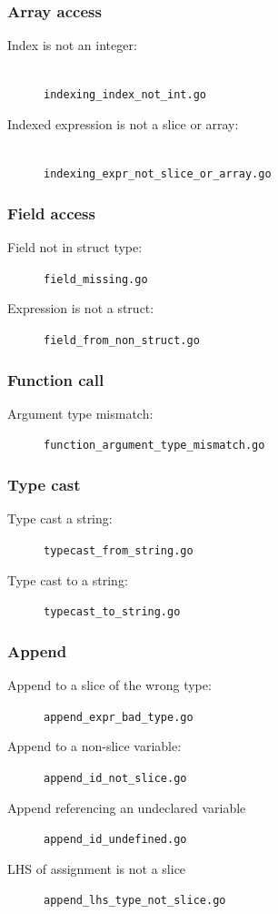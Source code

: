 \documentclass[oneside]{article}
\begin{document}
\subsubsection{Array access}
\begin{description}
  \item[Index is not an integer:]\ \\
    \verb|indexing_index_not_int.go|
  \item[Indexed expression is not a slice or array:]\ \\
    \verb|indexing_expr_not_slice_or_array.go|
\end{description}

\subsubsection{Field access}
\begin{description}
  \item[Field not in struct type:] \verb|field_missing.go|
  \item[Expression is not a struct:] \verb|field_from_non_struct.go|
\end{description}

\subsubsection{Function call}
\begin{description}
  \item[Argument type mismatch:] \verb|function_argument_type_mismatch.go|
\end{description}

\subsubsection{Type cast}
\begin{description}
  \item[Type cast a string:] \verb|typecast_from_string.go|
  \item[Type cast to a string:] \verb|typecast_to_string.go|
\end{description}

\subsubsection{Append}
\begin{description}
  \item[Append to a slice of the wrong type:] \verb|append_expr_bad_type.go|
  \item[Append to a non-slice variable:] \verb|append_id_not_slice.go|
  \item[Append referencing an undeclared variable] \verb|append_id_undefined.go|
  \item[LHS of assignment is not a slice] \verb|append_lhs_type_not_slice.go|
\end{description}
\end{document}

